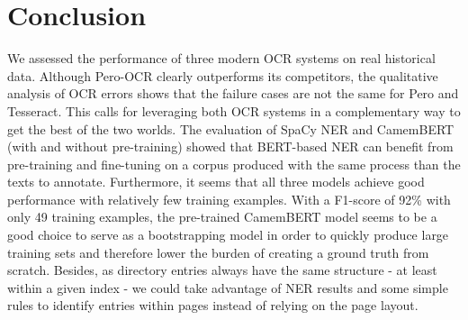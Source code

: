 \section{Conclusion}
We assessed the performance of three modern OCR systems on real historical data.
Although Pero-OCR clearly outperforms its competitors, the qualitative analysis of OCR errors shows that the failure cases are not the same for Pero and Tesseract.
This calls for leveraging both OCR systems in a complementary way to get the best of the two worlds.
The evaluation of SpaCy NER and CamemBERT (with and without pre-training) showed that BERT-based NER can benefit from pre-training and fine-tuning on a corpus produced with the same process than the texts to annotate.
Furthermore, it seems that all three models achieve good performance with relatively few training examples.
With a F1-score of 92\% with only 49 training examples, the pre-trained CamemBERT model seems to be a good choice to serve as a bootstrapping model in order to quickly produce large training sets and therefore lower the burden of creating a ground truth from scratch.
Besides, as directory entries always have the same structure - at least within a given index - we could take advantage of NER results and some simple rules to identify entries within pages instead of relying on the page layout.

